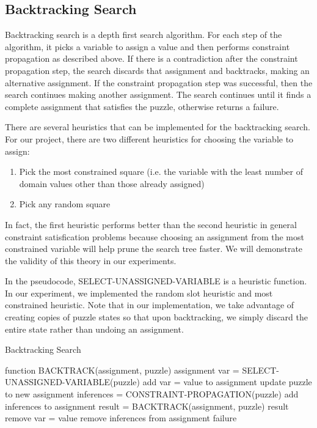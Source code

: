 \subsection{Backtracking Search}

Backtracking search is a depth first search algorithm. For each step of the algorithm, it picks a variable to assign a value and then performs constraint propagation as described above. If there is a contradiction after the constraint propagation step, the search discards that assignment and backtracks, making an alternative assignment. If the constraint propagation step was successful, then the search continues making another assignment. The search continues until it finds a complete assignment that satisfies the puzzle, otherwise returns a failure.

There are several heuristics that can be implemented for the backtracking search. For our project, there are two different heuristics for choosing the variable to assign:

\begin{enumerate}
	\item Pick the most constrained square (i.e. the variable with the least number of domain values other than those already assigned)
	\item Pick any random square
\end{enumerate}

In fact, the first heuristic performs better than the second heuristic in general constraint satisfication problems because choosing an assignment from the most constrained variable will help prune the search tree faster. We will demonstrate the validity of this theory in our experiments.

In the pseudocode, SELECT-UNASSIGNED-VARIABLE is a heuristic function. In our experiment, we implemented the random slot heuristic and most constrained heuristic. Note that in our implementation, we take advantage of creating copies of puzzle states so that upon backtracking, we simply discard the entire state rather than undoing an assignment.

\begin{algorithm}[H]
\caption{Backtracking Search}
\label{backtrack}
\begin{algorithmic}
\STATE function BACKTRACK(assignment, puzzle)
	\RETURN assignment
\ENDIF
\STATE var = SELECT-UNASSIGNED-VARIABLE(puzzle)
		\STATE add {var = value} to assignment
		\STATE update puzzle to new assignment
		\STATE inferences = CONSTRAINT-PROPAGATION(puzzle)
			\STATE add inferences to assignment
			\STATE result = BACKTRACK(assignment, puzzle)
				\RETURN result
			\ENDIF
		\ENDIF
	\ENDIF
	\STATE remove {var = value}
	\STATE remove inferences from assignment
\ENDFOR
\RETURN failure
\end{algorithmic}
\end{algorithm}

